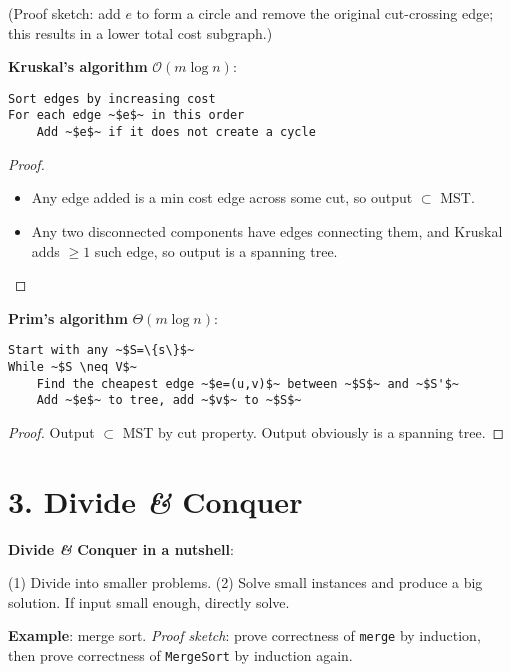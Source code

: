 \documentclass{memoir}
\begin{document}
\begin{multicols*}{3}
(Proof sketch: add $e$ to form a circle and remove the original cut-crossing edge; this results in a lower total cost subgraph.)

\textbf{Kruskal's algorithm} $\mathcal{O}(m\log n)$:

\begin{lstlisting}[basicstyle=\fontsize{7}{8}\selectfont\ttfamily]
Sort edges by increasing cost
For each edge ~$e$~ in this order
	Add ~$e$~ if it does not create a cycle
\end{lstlisting}

\begin{proof}{}{}
		\begin{itemize}
				\item Any edge added is a min cost edge across some cut, so output $\subset $ MST.
				\item Any two disconnected components have edges connecting them, and Kruskal adds $\geqslant 1$ such edge, so output is a spanning tree. \qedhere
		\end{itemize}
\end{proof}

\textbf{Prim's algorithm} $\Theta(m\log n)$:
\begin{lstlisting}[basicstyle=\fontsize{7}{8}\selectfont\ttfamily]
Start with any ~$S=\{s\}$~
While ~$S \neq V$~
	Find the cheapest edge ~$e=(u,v)$~ between ~$S$~ and ~$S'$~
	Add ~$e$~ to tree, add ~$v$~ to ~$S$~
\end{lstlisting}
\begin{proof}{}{}
		Output $\subset $ MST by cut property. Output obviously is a spanning tree.
\end{proof}

\section*{3. Divide \textit{\&} Conquer}

\textbf{Divide \textit{\&} Conquer in a nutshell}:

		(1) Divide into smaller problems. (2) Solve small instances and produce a big solution. If input small enough, directly solve.
  
  \textbf{Example}: merge sort. \textit{Proof sketch}: prove correctness of \texttt{merge} by induction, then prove correctness of \texttt{MergeSort} by induction again.



\end{multicols*}
\end{document}
